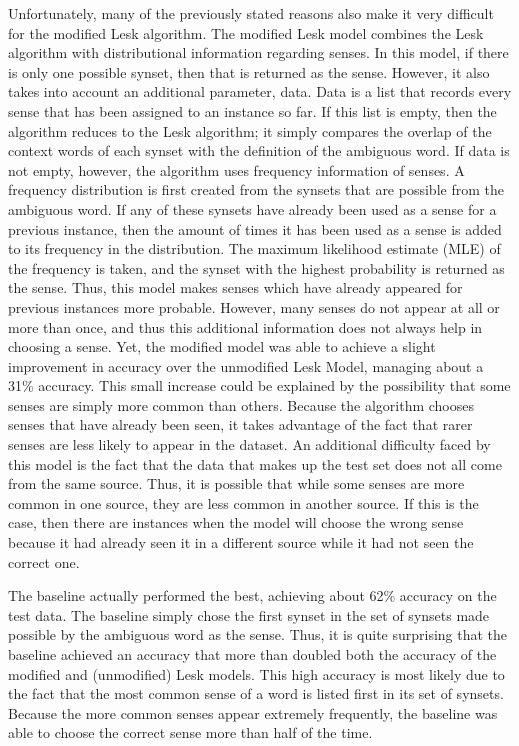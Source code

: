 \documentclass{article}
\begin{document}
Unfortunately, many of the previously stated reasons also make it very difficult for the modified Lesk algorithm.  The modified Lesk model combines the Lesk algorithm with distributional information regarding senses.  In this model, if there is only one possible synset, then that is returned as the sense.  However, it also takes into account an additional parameter, data.  Data is a list that records every sense that has been assigned to an instance so far.  If this list is empty, then the algorithm reduces to the Lesk algorithm; it simply compares the overlap of the context words of each synset with the definition of the ambiguous word.  If data is not empty, however, the algorithm uses frequency information of senses.  A frequency distribution is first created from the synsets that are possible from the ambiguous word.  If any of these synsets have already been used as a sense for a previous instance, then the amount of times it has been used as a sense is added to its frequency in the distribution.  The maximum likelihood estimate (MLE) of the frequency is taken, and the synset with the highest probability is returned as the sense.  Thus, this model makes senses which have already appeared for previous instances more probable.  However, many senses do not appear at all or more than once, and thus this additional information does not always help in choosing a sense.  Yet, the modified model was able to achieve a slight improvement in accuracy over the unmodified Lesk Model, managing about a 31\% accuracy.  This small increase could be explained by the possibility that some senses are simply more common than others.  Because the algorithm chooses senses that have already been seen, it takes advantage of the fact that rarer senses are less likely to appear in the dataset.  An additional difficulty faced by this model is the fact that the data that makes up the test set does not all come from the same source.  Thus, it is possible that while some senses are more common in one source, they are less common in another source.  If this is the case, then there are instances when the model will choose the wrong sense because it had already seen it in a different source while it had not seen the correct one.

The baseline actually performed the best, achieving about 62\% accuracy on the test data.  The baseline simply chose the first synset in the set of synsets made possible by the ambiguous word as the sense.  Thus, it is quite surprising that the baseline achieved an accuracy that more than doubled both the accuracy of the modified and (unmodified) Lesk models.  This high accuracy is most likely due to the fact that the most common sense of a word is listed first in its set of synsets.  Because the more common senses appear extremely frequently, the baseline was able to choose the correct sense more than half of the time.
\end{document}
